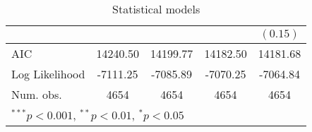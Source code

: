 \begin{table}
\begin{center}
\begin{tabular}{l c c c c }
               &               &               &               & $(0.15)$      \\
\hline
AIC            & 14240.50      & 14199.77      & 14182.50      & 14181.68      \\
Log Likelihood & -7111.25      & -7085.89      & -7070.25      & -7064.84      \\
Num. obs.      & 4654          & 4654          & 4654          & 4654          \\
\hline
\multicolumn{5}{l}{\scriptsize{$^{***}p<0.001$, $^{**}p<0.01$, $^*p<0.05$}}
\end{tabular}
\caption{Statistical models}
\label{table:coefficients}
\end{center}
\end{table}
